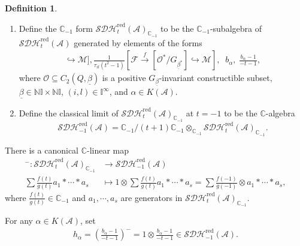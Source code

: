 \documentclass[12pt]{amsart}
\theoremstyle{definition}
\newtheorem{definition}[theorem]{Definition}
\numberwithin{equation}{section}
\begin{document}
\begin{definition}\;
    \label{Classical limit of SDH}
    \begin{enumerate}
        \item Define the $ \mathbb{C}_{-1} $ form $ \mathcal{SDH}_t^{\mathrm{red}}(\mathcal{A})_{\mathbb{C}_{-1}} $ to be the $ \mathbb{C}_{-1} $-subalgebra of $ \mathcal{SDH}_t^{\mathrm{red}}(\mathcal{A}) $ generated by elements of the forms
    \begin{align*}
    [\mathcal{F} \xrightarrow{f}[\mathcal{O}/G_{\underline{\beta}}]\hookrightarrow \mathcal{M}],\frac{1}{\tau_{il}(t^2-1)}[\mathcal{F} \xrightarrow{f}[\mathcal{O}^*/G_{\underline{\beta}^*}] \hookrightarrow \mathcal{M}],\;\;b_{\alpha},\;\frac{b_{\alpha}-1}{-t-1},
    \end{align*}
    where $ \mathcal{O} \subseteq C_2(Q, \underline{\beta}) $ is a positive $ G_{\underline{\beta}} $-invariant constructible subset, $\underline{\beta} \in \mathbb{N}\mathbb{I} \times \mathbb{N}\mathbb{I} $, $ (i,l) \in \mathbb{I}^{\infty} $, and $\alpha \in K(\mathcal{A}) $. 

    \item Define the classical limit of $ \mathcal{SDH}_t^{\mathrm{red}}(\mathcal{A})_{\mathbb{C}_{-1}} $ at $ t=-1 $ to be the $ \mathbb{C} $-algebra
    \[\mathcal{SDH}_{-1}^{\mathrm{red}}(\mathcal{A}) = \mathbb{C}_{-1}/(t+1)\mathbb{C}_{-1} \otimes_{\mathbb{C}_{-1}} \mathcal{SDH}_t^{\mathrm{red}}(\mathcal{A})_{\mathbb{C}_{-1}}.\]        
    \end{enumerate}
        
\end{definition}

There is a canonical $ \mathbb{C} $-linear map
    \begin{align*}
        {}^{-}:\mathcal{SDH}_t^{\mathrm{red}}(\mathcal{A})_{\mathbb{C}_{-1}} &\to  \mathcal{SDH}_{-1}^{\mathrm{red}}(\mathcal{A})\\
        \sum \frac{f(t)}{g(t)} a_1 * \cdots * a_s &\mapsto 1 \otimes \sum \frac{f(t)}{g(t)} a_1 * \cdots * a_s =\sum \frac{f(-1)}{g(-1)} \otimes a_1 * \cdots * a_s, 
    \end{align*}
    where $  \frac{f(t)}{g(t)} \in \mathbb{C}_{-1} $ and $ a_1, \cdots ,a_s $ are generators in $ \mathcal{SDH}_t^{\mathrm{red}}(\mathcal{A})_{\mathbb{C}_{-1}}  $. 
    
For any $ \alpha \in K(\mathcal{A}) $, set
\begin{align*}
    h_{\alpha} =(\frac{b_{\alpha}-1}{-t-1} )^- =1 \otimes  \frac{b_{\alpha}-1}{-t-1} \in \mathcal{SDH}_{-1}^{\mathrm{red}}(\mathcal{A}). 
\end{align*}
\end{document}
